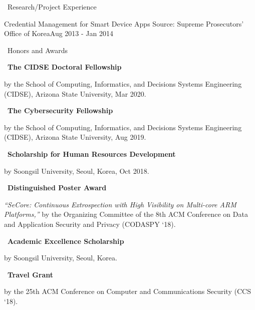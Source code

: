 \documentclass{resume} %
\begin{document}
\begin{rSection}{\faGenderless~Research/Project Experience}
	\begin{rSubsection3}
		{Credential Management for Smart Device Apps}
		{Source: Supreme Prosecutors' Office of Korea}{Aug 2013 - Jan 2014}
	\end{rSubsection3}
\end{rSection}


\begin{rSection}{\faGenderless~Honors and Awards}
    \strut\textbullet~{\bf The CIDSE Doctoral Fellowship}\\
    \strut\hspace{1cm}\parbox[t]{\linegoal}{by the School of Computing, Informatics, and Decisions Systems Engineering (CIDSE), Arizona State University, Mar 2020.}

    \strut\textbullet~{\bf The Cybersecurity Fellowship}\\
    \strut\hspace{1cm}\parbox[t]{\linegoal}{by the School of Computing, Informatics, and Decisions Systems Engineering (CIDSE), Arizona State University, Aug 2019.}

	\strut\textbullet~{\bf Scholarship for Human Resources Development}\\
	\strut\hspace{1cm}by Soongsil University, Seoul, Korea, Oct 2018.

	\strut\textbullet~{\bf Distinguished Poster Award}\\
	\strut\hspace{1cm}\parbox[t]{\linegoal}{\emph{``SeCore: Continuous Extrospection with High Visibility on Multi-core ARM Platforms,''} by the Organizing Committee of the 8th ACM Conference on Data and Application Security and Privacy (CODASPY `18).}

	\strut\textbullet~{\bf Academic Excellence Scholarship}\\
	\strut\hspace{1cm}by Soongsil University, Seoul, Korea.

	\strut\textbullet~{\bf Travel Grant}\\
	\strut\hspace{1cm}by the 25th ACM Conference on Computer and Communications Security (CCS `18).

\end{rSection}
\end{document}
